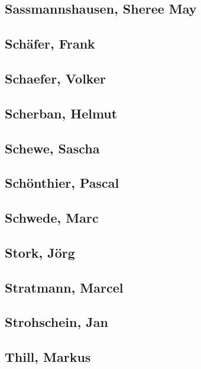 \subsection{Sassmannshausen, Sheree
May}\label{sassmannshausen-sheree-may}

\subsection{Schäfer, Frank}\label{schuxe4fer-frank}

\subsection{Schaefer, Volker}\label{schaefer-volker}

\subsection{Scherban, Helmut}\label{scherban-helmut}

\subsection{Schewe, Sascha}\label{schewe-sascha}

\subsection{Schönthier, Pascal}\label{schuxf6nthier-pascal}

\subsection{Schwede, Marc}\label{schwede-marc}

\subsection{Stork, Jörg}\label{stork-juxf6rg}

\subsection{Stratmann, Marcel}\label{stratmann-marcel}

\subsection{Strohschein, Jan}\label{strohschein-jan}

\subsection{Thill, Markus}\label{thill-markus}


